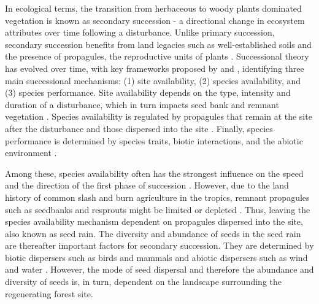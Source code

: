 In ecological terms, the transition from herbaceous to woody plants dominated vegetation is known as secondary succession - a directional change in ecosystem attributes over time following a disturbance. Unlike primary succession, secondary succession benefits from land legacies such as well-established soils and the presence of propagules, the reproductive units of plants \citep{poorterSuccessionalTheories2023}. %
Successional theory has evolved over time, with 
key frameworks proposed by \citet{pickettHierarchicalConsiderationCauses1987} and \citet{poorterComprehensiveFrameworkVegetation2024}, identifying three main successional mechanisms: (1) site availability, (2) species availability, and (3) species performance. Site availability depends on the type, intensity and duration of a disturbance, which in turn impacts seed bank and remnant vegetation \citep{poorterComprehensiveFrameworkVegetation2024}. Species availability is regulated by propagules that remain at the site after the disturbance and those dispersed into the site \citep{gleasonIndividualisticConceptPlant1926, dentUnitingNicheDifferentiation2021}. Finally, species performance is determined by species traits, biotic interactions, and the abiotic environment \citep{poorterComprehensiveFrameworkVegetation2024}. 

Among these, species availability often has the strongest influence on the speed and the direction of the first phase of succession \citep{poorterSuccessionalTheories2023, dentUnitingNicheDifferentiation2021}. However, due to the land history of common slash and burn agriculture in the tropics, remnant propagules such as seedbanks and resprouts might be limited or depleted \citep{bezerraDrasticImpoverishmentSoil2022}. Thus, leaving the species availability mechanism dependent on propagules dispersed into the site, also known as seed rain. The diversity and abundance of seeds in the seed rain are thereafter important factors for secondary succession. They are determined by biotic dispersers such as birds and mammals and abiotic dispersers such as wind and water \citep{poorterComprehensiveFrameworkVegetation2024}. However, the mode of seed dispersal and therefore the abundance and diversity of seeds is, in turn, dependent on the landscape surrounding the regenerating forest site. 


